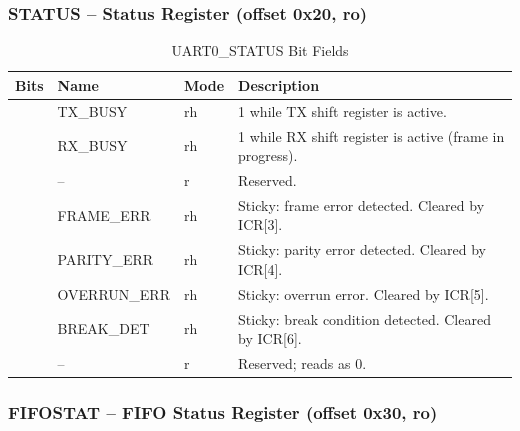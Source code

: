 \subsubsection{STATUS -- Status Register (offset 0x20, ro)}

\begin{table}[H]
\caption{UART0\_STATUS Bit Fields}
\label{tab:asUartSTATUS}
\centering
\begin{tabularx}{\textwidth}{|l |l |l |X|}
  \hline
  Bits & Name & Mode & Description \\
  \hline
  \hline
  [0]    & TX\_BUSY    & rh  & 1 while TX shift register is active. \\
  \hline
  [1]    & RX\_BUSY    & rh  & 1 while RX shift register is active (frame in progress). \\
  \hline
  [3:2]  & --          & r   & Reserved. \\
  \hline
  [4]    & FRAME\_ERR  & rh  & Sticky: frame error detected. Cleared by ICR[3]. \\
  \hline
  [5]    & PARITY\_ERR & rh  & Sticky: parity error detected. Cleared by ICR[4]. \\
  \hline
  [6]    & OVERRUN\_ERR & rh & Sticky: overrun error. Cleared by ICR[5]. \\
  \hline
  [7]    & BREAK\_DET  & rh  & Sticky: break condition detected. Cleared by ICR[6]. \\
  \hline
  [63:8] & --          & r   & Reserved; reads as 0. \\
  \hline
\end{tabularx}
\end{table}

\subsubsection{FIFOSTAT -- FIFO Status Register (offset 0x30, ro)}

